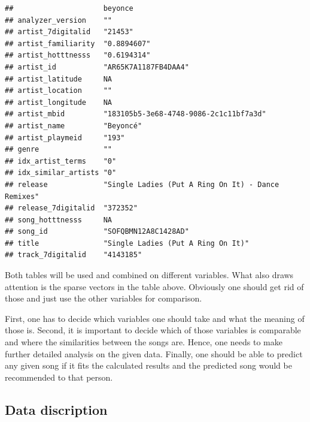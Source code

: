 \documentclass[]{article}
\begin{document}
\begin{verbatim}
##                     beyonce                                           
## analyzer_version    ""                                                
## artist_7digitalid   "21453"                                           
## artist_familiarity  "0.8894607"                                       
## artist_hotttnesss   "0.6194314"                                       
## artist_id           "AR65K7A1187FB4DAA4"                              
## artist_latitude     NA                                                
## artist_location     ""                                                
## artist_longitude    NA                                                
## artist_mbid         "183105b5-3e68-4748-9086-2c1c11bf7a3d"            
## artist_name         "Beyoncé"                                         
## artist_playmeid     "193"                                             
## genre               ""                                                
## idx_artist_terms    "0"                                               
## idx_similar_artists "0"                                               
## release             "Single Ladies (Put A Ring On It) - Dance Remixes"
## release_7digitalid  "372352"                                          
## song_hotttnesss     NA                                                
## song_id             "SOFQBMN12A8C1428AD"                              
## title               "Single Ladies (Put A Ring On It)"                
## track_7digitalid    "4143185"
\end{verbatim}

Both tables will be used and combined on different variables. What also
draws attention is the sparse vectors in the table above. Obviously one
should get rid of those and just use the other variables for comparison.

First, one has to decide which variables one should take and what the
meaning of those is. Second, it is important to decide which of those
variables is comparable and where the similarities between the songs
are. Hence, one needs to make further detailed analysis on the given
data. Finally, one should be able to predict any given song if it fits
the calculated results and the predicted song would be recommended to
that person.

\subsection{Data discription}\label{data-discription}
\end{document}
